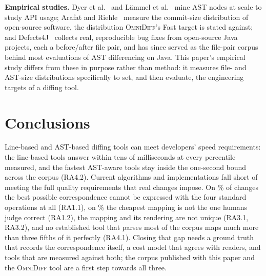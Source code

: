 \documentclass[sigconf]{acmart}
\begin{document}
\textbf{Empirical studies.} Dyer et al.~\cite{ast-api-1} and L\"{a}mmel et al.~\cite{ast-api-2}
mine AST nodes at scale to study API usage; Arafat and
Riehle~\cite{commit-size-distribution-paper} measure the commit-size distribution of open-source
software, the distribution \textsc{OmniDiff}'s Fast target is stated against; and
Defects4J~\cite{defects4j} collects real, reproducible bug fixes from open-source Java projects,
each a before/after file pair, and has since served as the file-pair corpus behind most
evaluations of AST differencing on Java. This paper's empirical study differs from these in
purpose rather than method: it measures file- and AST-size
distributions specifically to set, and then evaluate, the engineering targets of a diffing tool.

\section{Conclusions}
\label{sec:conclusion}

Line-based and AST-based diffing tools can meet developers' speed requirements: the line-based
tools answer within tens of milliseconds at every percentile measured, and the fastest AST-aware
tools stay inside the one-second bound across the corpus (RA4.2). Current algorithms and implementations fall short of meeting the
full quality requirements that real changes impose. On \AmbiguityListPct{}\% of changes the
best possible correspondence cannot be expressed with the four standard operations at all
(RA1.1), on \CostHumanHigherPct{}\% the cheapest mapping is not the one humans judge correct
(RA1.2), the mapping and its rendering are not unique (RA3.1, RA3.2), and no established tool
that parses most of the corpus maps much more than three fifths of it perfectly (RA4.1). Closing that gap needs a ground truth
that records the correspondence itself, a cost model that agrees with readers, and tools that
are measured against both; the corpus published with this paper and the \textsc{OmniDiff} tool
are a first step towards all three.



\end{document}
